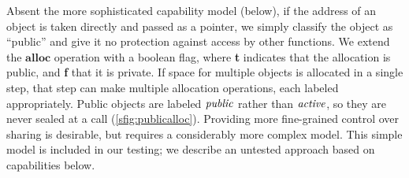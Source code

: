 \documentclass[10pt,conference]{ieeetran}%
\theoremstyle{definition}
\begin{document}
Absent the more sophisticated capability model (below), if the address of an object
is taken directly and passed as a pointer, we simply classify the object as ``public''
and give it no protection against access by other functions.
We extend the \(\mathbf{alloc}\) operation with a boolean flag, where {\bf t} indicates
that the allocation is public, and {\bf f} that it is private.
If space for multiple objects is allocated in a single step,
that step can make multiple allocation operations, each labeled appropriately.
Public objects are labeled \(\mathit{public}\) rather than \(\mathit{active}\), so they are
never sealed at a call (\cref{sfig:publicalloc}).
Providing more fine-grained control over sharing is desirable, but requires a considerably
more complex model. This simple model is included in our testing; we describe
an untested approach based on capabilities below.
\end{document}
